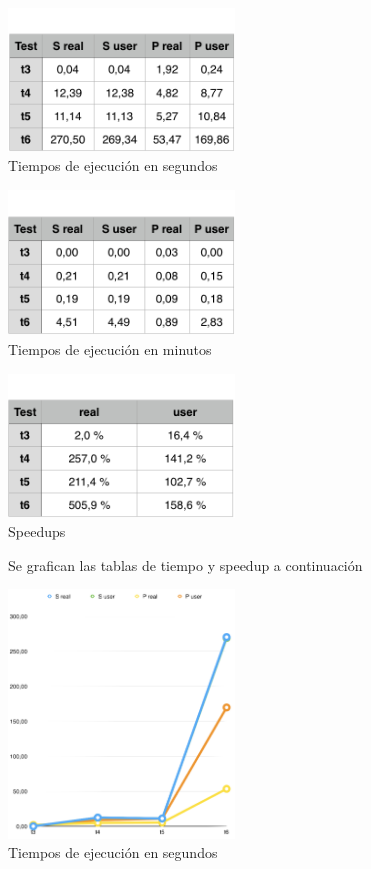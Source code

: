 \documentclass[10pt]{extarticle}
\begin{document}
\begin{center}
 \includegraphics[width=6cm]{imgs/table_seconds.png}\\
 \footnotesize{Tiempos de ejecución en segundos}\\
\end{center}

\begin{center}
 \includegraphics[width=6cm]{imgs/table_minutes.png}\\
 \footnotesize{Tiempos de ejecución en minutos}\\
\end{center}

\begin{center}
 \includegraphics[width=6cm]{imgs/table_speedup.png}\\
 \footnotesize{Speedups}\\
\end{center}

Se grafican las tablas de tiempo y speedup a continuación

\begin{center}
 \includegraphics[width=6cm]{imgs/graph_seconds.png}\\
 \footnotesize{Tiempos de ejecución en segundos}\\
\end{center}
\end{document}
